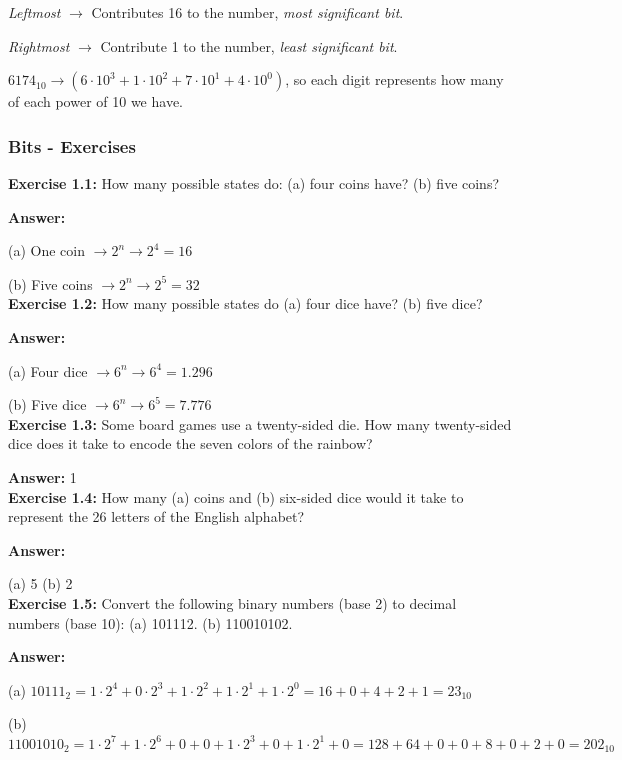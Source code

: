 \documentclass[12pt]{article}
\begin{document}
\textit{Leftmost} \(\rightarrow\) Contributes 16 to the number, \textit{most significant bit}.

\textit{Rightmost} \(\rightarrow\) Contribute 1 to the number, \textit{least significant bit}.

\(6174_{10} \rightarrow (6 \cdot 10^{3}+1 \cdot 10^{2}+7 \cdot 10^{1}+4 \cdot 10^{0})\), so each digit represents how many of each power of 10 we have.

\subsubsection{Bits - Exercises}

\textbf{Exercise 1.1:} How many possible states do: (a) four coins have? (b) five coins?

\textbf{Answer:}

(a) One coin \(\rightarrow 2^{n} \rightarrow 2^{4} = 16\)

(b) Five coins \(\rightarrow 2^{n} \rightarrow 2^{5} = 32\)\\

\textbf{Exercise 1.2:} How many possible states do (a) four dice have? (b) five dice?

\textbf{Answer:}

(a) Four dice \(\rightarrow 6^{n} \rightarrow 6^{4} = 1.296\)

(b) Five dice \(\rightarrow 6^{n} \rightarrow 6^{5} = 7.776\)\\

\textbf{Exercise 1.3:} Some board games use a twenty-sided die. How many twenty-sided dice does it take to encode the seven colors of the rainbow?

\textbf{Answer:} 1\\

\textbf{Exercise 1.4:} How many (a) coins and (b) six-sided dice would it take to represent the 26 letters of the English alphabet?

\textbf{Answer:}

(a) 5
(b) 2\\

\textbf{Exercise 1.5:} Convert the following binary numbers (base 2) to decimal numbers (base 10): (a) 101112. (b) 110010102.

\textbf{Answer:}

(a) \(10111_{2} = 1 \cdot 2^{4} + 0 \cdot 2^{3} + 1 \cdot 2^{2} + 1 \cdot 2^{1} + 1 \cdot 2^{0} = 16 + 0 + 4 + 2 + 1 = 23_{10} \)

(b) \(11001010_{2} = 1 \cdot 2^{7} + 1 \cdot 2^{6} + 0 + 0 + 1 \cdot 2^{3} + 0 + 1 \cdot 2^{1} + 0 = 128 + 64 + 0 + 0 + 8 + 0 + 2 + 0 = 202_{10}\)\\
\end{document}
